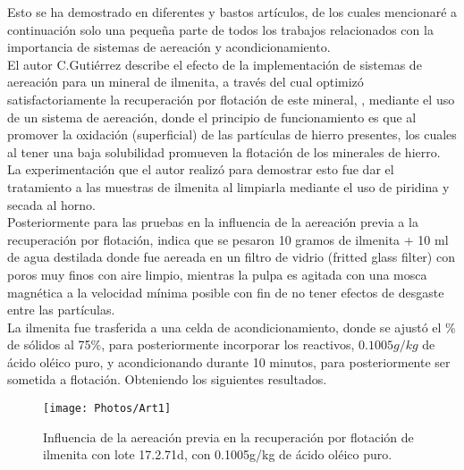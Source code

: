 \documentclass[11pt,letter
								]
								{article}
\begin{document}
Esto se ha demostrado en diferentes y bastos  artículos, de los cuales mencionaré  a continuación solo una pequeña parte de todos los trabajos relacionados con la importancia de sistemas de aereación y acondicionamiento.\\




El autor C.Gutiérrez \cite{art1}  describe el efecto de la implementación de  sistemas de aereación para un mineral 
de ilmenita, a través del cual optimizó  satisfactoriamente la recuperación por flotación de este mineral,%
, mediante el uso de un  sistema de aereación, donde el principio de funcionamiento es que al promover la oxidación (superficial)  de las partículas de hierro presentes, los cuales al tener una baja solubilidad  promueven la flotación de los minerales de hierro. \\

La experimentación que el autor realizó  para demostrar esto fue dar el tratamiento a las muestras de ilmenita al limpiarla mediante el uso de piridina y secada al horno.\\
Posteriormente para las pruebas en la influencia de la aereación previa a la recuperación por flotación, indica que se pesaron 10 gramos de ilmenita + 10 ml de agua destilada donde fue aereada en  un  filtro de vidrio (fritted glass filter) con poros muy finos con aire limpio, mientras la pulpa es agitada con una mosca magnética a la velocidad mínima posible con fin de no tener efectos de desgaste entre las partículas.\\

La ilmenita fue trasferida a una celda de acondicionamiento, donde se ajustó el \% de sólidos al 75\%, para posteriormente incorporar  los reactivos, $0.1005   g/kg $ de ácido oléico puro, y acondicionando  durante 10 minutos, para posteriormente ser sometida a flotación. Obteniendo los siguientes resultados. \cite{art1}\\





\begin{figure}[H]
\centering
\texttt{[image: Photos/Art1]}
\caption{Influencia de la aereación previa en la recuperación por flotación de ilmenita con lote 17.2.71d, con 0.1005g/kg de ácido oléico puro.\cite{art1} } 
\label{1}
\end{figure}
\end{document}
